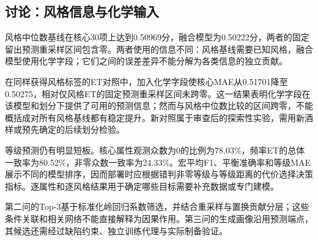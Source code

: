 \subsection{讨论：风格信息与化学输入}

风格中位数基线在核心30项上达到0.50969分，融合模型为0.50222分，两者的固定留出预测重采样区间包含零。两者使用的信息不同：风格基线需要已知风格，融合模型使用化学字段；它们之间的误差差异不能分解为各类信息的独立贡献。

在同样获得风格标签的ET对照中，加入化学字段使核心MAE从0.51701降至0.50275，相对仅风格ET的固定预测重采样区间未跨零。这一结果表明化学字段在该模型和划分下提供了可用的预测信息；然而与风格中位数比较的区间跨零，不能概括成对所有风格基线都有稳定提升。新对照属于审查后的探索性实验，需用新酒样或预先确定的后续划分检验。

等级预测仍有明显短板。核心属性观测众数为0的比例为78.03\%，频率ET的总体一致率为80.52\%，非零众数一致率为24.33\%。宏平均F1、平衡准确率和等级MAE展示不同的模型排序，因而部署时应根据错判非零等级与等级距离的代价选择决策指标。逐属性和逐风格结果用于确定哪些目标需要补充数据或专门建模。

第二问的Top-3基于标准化岭回归系数筛选，并结合重采样与置换贡献分层；这些条件关联和相关网络不能直接解释为因果作用。第三问的生成画像沿用预测端点，其候选还需经过缺陷约束、独立训练代理与实际制备验证。

